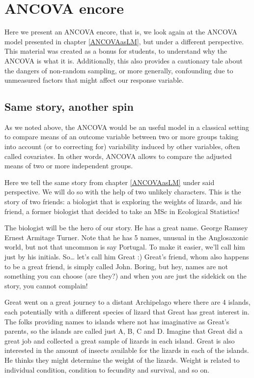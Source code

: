 \documentclass[
]{book}
\begin{document}
\section{ANCOVA encore}\label{ANCOVAe}

Here we present an ANCOVA encore, that is, we look again at the ANCOVA model presented in chapter \ref{ANCOVAasLM}, but under a different perspective. This material was created as a bonus for students, to understand why the ANCOVA is what it is. Additionally, this also provides a cautionary tale about the dangers of non-random sampling, or more generally, confounding due to unmeasured factors that might affect our response variable.

\subsection{Same story, another spin}\label{same-story-another-spin}

As we noted above, the ANCOVA would be an useful model in a classical setting to compare means of an outcome variable between two or more groups taking into account (or to correcting for) variability induced by other variables, often called covariates. In other words, ANCOVA allows to compare the adjusted means of two or more independent groups.

Here we tell the same story from chapter \ref{ANCOVAasLM} under said perspective. We will do so with the help of two unlikely characters. This is the story of two friends: a biologist that is exploring the weights of lizards, and his friend, a former biologist that decided to take an MSc in Ecological Statistics!

The biologist will be the hero of our story. He has a great name. George Ramsey Ernest Armitage Turner. Note that he has 5 names, unusual in the Anglosaxonic world, but not that uncommon is say Portugal. To make it easier, we'll call him just by his initials. So\ldots{} let's call him Great :) Great's friend, whom also happens to be a great friend, is simply called John. Boring, but hey, names are not something you can choose (are they?) and when you are just the sidekick on the story, you cannot complain!

Great went on a great journey to a distant Archipelago where there are 4 islands, each potentially with a different species of lizard that Great has great interest in. The folks providing names to islands where not has imaginative as Great's parents, so the islands are called just A, B, C and D. Imagine that Great did a great job and collected a great sample of lizards in each island. Great is also interested in the amount of insects available for the lizards in each of the islands. He thinks they might determine the weight of the lizards. Weight is related to individual condition, condition to fecundity and survival, and so on.
\end{document}
